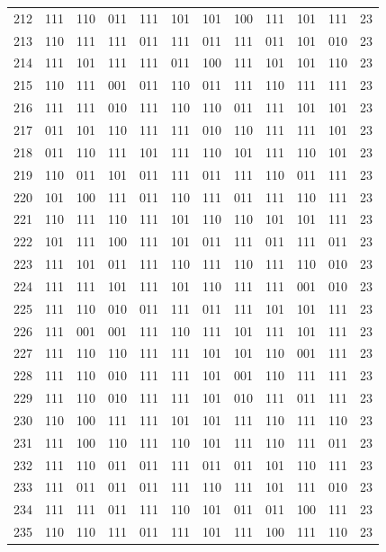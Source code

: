 \begin{longtable}{r*{10}{c}r}
212 & 111 & 110 & 011 & 111 & 101 & 101 & 100 & 111 & 101 & 111 & 23\\
213 & 110 & 111 & 111 & 011 & 111 & 011 & 111 & 011 & 101 & 010 & 23\\
214 & 111 & 101 & 111 & 111 & 011 & 100 & 111 & 101 & 101 & 110 & 23\\
215 & 110 & 111 & 001 & 011 & 110 & 011 & 111 & 110 & 111 & 111 & 23\\
216 & 111 & 111 & 010 & 111 & 110 & 110 & 011 & 111 & 101 & 101 & 23\\
217 & 011 & 101 & 110 & 111 & 111 & 010 & 110 & 111 & 111 & 101 & 23\\
218 & 011 & 110 & 111 & 101 & 111 & 110 & 101 & 111 & 110 & 101 & 23\\
219 & 110 & 011 & 101 & 011 & 111 & 011 & 111 & 110 & 011 & 111 & 23\\
220 & 101 & 100 & 111 & 011 & 110 & 111 & 011 & 111 & 110 & 111 & 23\\
221 & 110 & 111 & 110 & 111 & 101 & 110 & 110 & 101 & 101 & 111 & 23\\
222 & 101 & 111 & 100 & 111 & 101 & 011 & 111 & 011 & 111 & 011 & 23\\
223 & 111 & 101 & 011 & 111 & 110 & 111 & 110 & 111 & 110 & 010 & 23\\
224 & 111 & 111 & 101 & 111 & 101 & 110 & 111 & 111 & 001 & 010 & 23\\
225 & 111 & 110 & 010 & 011 & 111 & 011 & 111 & 101 & 101 & 111 & 23\\
226 & 111 & 001 & 001 & 111 & 110 & 111 & 101 & 111 & 101 & 111 & 23\\
227 & 111 & 110 & 110 & 111 & 111 & 101 & 101 & 110 & 001 & 111 & 23\\
228 & 111 & 110 & 010 & 111 & 111 & 101 & 001 & 110 & 111 & 111 & 23\\
229 & 111 & 110 & 010 & 111 & 111 & 101 & 010 & 111 & 011 & 111 & 23\\
230 & 110 & 100 & 111 & 111 & 101 & 101 & 111 & 110 & 111 & 110 & 23\\
231 & 111 & 100 & 110 & 111 & 110 & 101 & 111 & 110 & 111 & 011 & 23\\
232 & 111 & 110 & 011 & 011 & 111 & 011 & 011 & 101 & 110 & 111 & 23\\
233 & 111 & 011 & 011 & 011 & 111 & 110 & 111 & 101 & 111 & 010 & 23\\
234 & 111 & 111 & 011 & 111 & 110 & 101 & 011 & 011 & 100 & 111 & 23\\
235 & 110 & 110 & 111 & 011 & 111 & 101 & 111 & 100 & 111 & 110 & 23\\

\end{longtable}
